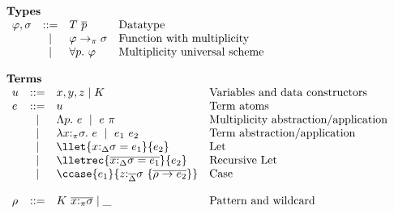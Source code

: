 
\begin{figure}[h]
\begin{framed}
\[
\begin{array}{l}
%
\textbf{Types} \\
\begin{array}{lcll}
    \varphi,\sigma  & ::=  & T~\overline{p}         & \textrm{Datatype} \\
                    & \mid & \varphi \to_\pi \sigma & \textrm{Function with multiplicity}\\
                    & \mid & \forall p.~\varphi     & \textrm{Multiplicity universal scheme}\\
\end{array}\\\\
%
\textbf{Terms}\\
\begin{array}{lcll}
    u                & ::=  & x,y,z \mid K                                                     & \textrm{Variables and data constructors}\\
    e                & ::=  & u                                                                & \textrm{Term atoms}\\
                     & \mid & \Lambda p.~e~\mid~e~\pi                                          & \textrm{Multiplicity abstraction/application}\\
                     & \mid & \lambda x{:}_\pi\sigma.~e~\mid~e_1~e_2                           & \textrm{Term abstraction/application}\\
                     & \mid & \llet{x{:}_\Delta\sigma = e_1}{e_2}                              & \textrm{Let} \\
                     & \mid & \lletrec{\overline{x{:}_\Delta\sigma = e_1}}{e_2}                & \textrm{Recursive Let} \\
                     & \mid & \ccase{e_1}{z{:}_{\overline{\Delta}}\sigma~\{\overline{\rho\to e_2}\}} & \textrm{Case} \\
                     &      &                                                                  & \\
    \rho             & ::=  & K~\overline{x{:}_\pi\sigma} \mid \_                              & \textrm{Pattern and wildcard} \\

\end{array}
\end{array}\]
\end{framed}
\end{figure}
